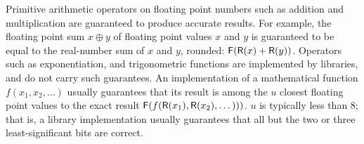 \documentclass{paper.tex}[subfiles]
\begin{document}
Primitive arithmetic operators on floating point numbers
  such as addition and multiplication
  are guaranteed to produce accurate results.
For example, the floating point sum
  $x \oplus y$ of floating point values $x$ and $y$
  is guaranteed to be equal to the real-number sum
  of $x$ and $y$, rounded: $\mathsf{F}(\mathsf{R}(x) + \mathsf{R}(y))$.
Operators such as exponentiation, and trigonometric functions
  are implemented by libraries, and do not carry such guarantees.
An implementation of a mathematical function $f(x_1, x_2, \dotsc)$
  usually guarantees that its result
  is among the $u$ closest floating point values
  to the exact result $\mathsf{F}(f(\mathsf{R}(x_1), \mathsf{R}(x_2), \dotsc)))$.
$u$ is typically less than 8; that is,
  a library implementation usually guarantees that all
  but the two or three least-significant bits are correct.
\end{document}
